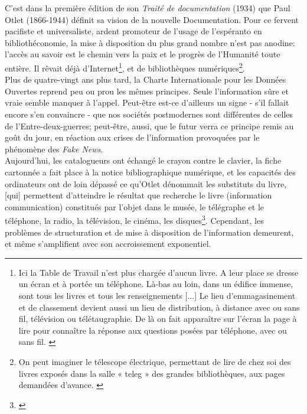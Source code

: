 \documentclass[a4paper,12pt,twoside]{book}
\begin{document}
C'est dans la première édition de son \textit{Traité de documentation} (1934) que Paul Otlet (1866-1944) définit sa vision de la nouvelle Documentation. Pour ce fervent pacifiste et universaliste, ardent promoteur de l'usage de l'espéranto en bibliothéconomie, la \og mise à disposition du plus grand nombre \fg{} n'est pas anodine: l'accès au savoir est le chemin vers la paix et le progrès de l'Humanité toute entière. Il rêvait déjà d'Internet\footnote{\og Ici la Table de Travail n’est plus chargée d’aucun livre. A leur place se dresse un écran et à portée un téléphone. Là-bas au loin, dans un édifice immense, sont tous les livres et tous les renseignements [...] Le lieu d’emmagasinement et de classement devient aussi un lieu de distribution, à distance avec ou sans fil, télévision ou télétaugraphie. De là on fait apparaître sur l’écran la page à lire pour connaître la réponse aux questions posées par téléphone, avec ou sans fil\fg. \cite[p.~428]{otletTraiteDocumentationLivre2021}}, et de bibliothèques numériques\footnote{\og On peut imaginer le télescope électrique, permettant de lire de chez soi des livres exposés dans la salle « teleg » des grandes bibliothèques, aux pages demandées d’avance\fg. \cite[p.~243]{otletTraiteDocumentationLivre2021}}.\\

Plus de quatre-vingt ans plus tard, la Charte Internationale pour les Données Ouvertes reprend peu ou prou les mêmes principes. Seule l'information \og sûre et vraie \fg{} semble manquer à l'appel. Peut-être est-ce d'ailleurs un signe - s'il fallait encore s'en convaincre - que nos sociétés postmodernes sont différentes de celles de l'Entre-deux-guerres; peut-être, aussi, que le futur verra ce principe remis au goût du jour, en réaction aux crises de l'information provoquées par le phénomène des \textit{Fake News}.\\

Aujourd'hui, les catalogueurs ont échangé le crayon contre le clavier, la fiche cartonnée a fait place à la notice bibliographique numérique, et les capacités des ordinateurs ont de loin dépassé ce qu'Otlet dénommait les \og substituts du livre, [qui] permettent d'atteindre le résultat que recherche le livre (information communication)\fg{} constitués par \og l’objet dans le musée, le télégraphe et le téléphone, la radio, la télévision, le cinéma, les disques\fg\footnote{\cite[p.~242-243]{otletTraiteDocumentationLivre2021}}. Cependant, les problèmes de structuration et de mise à disposition de l'information demeurent, et même s'amplifient avec son accroissement exponentiel.\\
\end{document}
